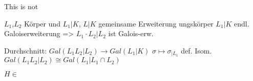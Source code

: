 \documentclass[../main.tex]{subfiles}
\begin{document}
This is not
\begin{theorem}[Translationssatz] %
    $L_1$,$L_2$ Körper und $L_1|K$, $L|K$ gemeinsame Erweiterung ungskörper
    $L_1|K$ endl. Galoiserweiterung => $L_1\cdot L_2|L_2$ ist Galois-erw.
    
    Durchschnitt: $Gal(L_1L_2|L_2)\rightarrow Gal(L_1|K)$
    $\sigma \mapsto \sigma_{|L_1}$ def. Isom.
    $Gal(L_1L_2|L_2) \cong Gal(L_1|L_1\cap L_2)$

    $H\in $
\end{theorem}
\end{document}
